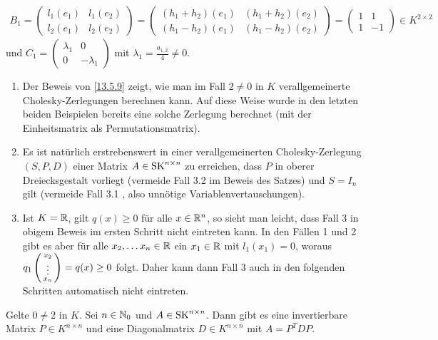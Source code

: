 \documentclass[../../main.tex]{subfiles}
\begin{document}
\begin{cproof}
\begin{align*}
B_1=\begin{pmatrix*}l_1(e_1) & l_1(e_2)\\ l_2(e_1) & l_2(e_2)\end{pmatrix*}=\begin{pmatrix*}(h_1+h_2)(e_1) & (h_1+h_2)(e_2)\\ (h_1-h_2)(e_1) & (h_1-h_2)(e_2)\end{pmatrix*}=\begin{pmatrix} 1 & 1 \\ 1 &  -1\end{pmatrix}\in K^{2\times 2}
\end{align*}
und $C_1=\begin{pmatrix}\lambda_1 & 0\\ 0 & -\lambda_1\end{pmatrix}$ mit $\lambda_1=\frac{a_{1,2}}{4}\neq 0$.
\end{cproof}

\begin{bem}\label{13.5.10}
\begin{enumerate}[\normalfont(a)]
\item Der Beweis von \ref{13.5.9} zeigt, wie man im Fall $2\neq 0$ in $K$ verallgemeinerte Cholesky-Zerlegungen berechnen kann. Auf diese Weise wurde in den letzten beiden Beispielen bereits eine solche Zerlegung berechnet (mit der Einheitsmatrix als Permutationsmatrix).
\item Es ist natürlich erstrebenswert in einer verallgemeinerten Cholesky-Zerlegung $(S,P,D)$ einer Matrix $A\in \operatorname{SK}^{n\times n}$ zu erreichen, dass $P$ in oberer Dreiecksgestalt vorliegt (vermeide Fall 3.2 im Beweis des Satzes) und $S=I_n$ gilt (vermeide Fall 3.1 , also unnötige Variablenvertauschungen).
\item Ist $K=\mathbb R$, gilt $q(x)\ge 0$ für alle $x\in \mathbb R^n$, so sieht man leicht, dass Fall 3 in obigem Beweis im ersten Schritt nicht eintreten kann. In den Fällen 1 und 2 gibt es aber für alle $x_2,\ldots x_n\in \mathbb R$  ein $x_1\in \mathbb R$ mit $l_1(x_1)=0$, woraus $q_1\left(\begin{smallmatrix}x_2\\\vdots\\x_n\end{smallmatrix}\right)=q(x)\ge 0$ folgt. Daher kann dann Fall 3 auch in den folgenden Schritten automatisch nicht eintreten.
\end{enumerate}
\end{bem}

\begin{kor}\label{13.5.11}
Gelte $0\neq 2$ in $K$. Sei $n\in \mathbb N_0$ und $A\in \operatorname{SK}^{n\times n}$. Dann gibt es eine invertierbare Matrix $P\in K^{n\times n}$ und eine Diagonalmatrix $D\in K^{n\times n}$ mit $A=P^TDP$.
\end{kor}
	
\end{document}
